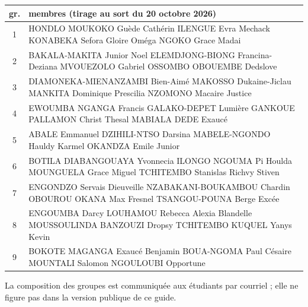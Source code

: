 \documentclass[11pt]{article}
\begin{document}
\ifdefined\versionclasse
\begin{center}
  \footnotesize\renewcommand{\arraystretch}{1.12}\setlength\tabcolsep{4pt}
  \begin{tabular}{c>{\raggedright\arraybackslash}p{}}
    \toprule
    \textbf{gr.} & \textbf{membres (tirage au sort du 20 octobre 2026)} \\
    \midrule
    1 & HONDLO MOUKOKO Guède Cathérin \textperiodcentered{} ILENGUE Evra Mechack \textperiodcentered{} KONABEKA Sefora Gloire Oméga \textperiodcentered{} NGOKO Grace Madai \\
    2 & BAKALA-MAKITA Junior Noel \textperiodcentered{} ELEMDJONG-BIONG Francina-Deziana \textperiodcentered{} MVOUEZOLO Gabriel \textperiodcentered{} OSSOMBO OBOUEMBE Dedslove \\
    3 & DIAMONEKA-MIENANZAMBI Bien-Aimé \textperiodcentered{} MAKOSSO Dukaine-Jiclau \textperiodcentered{} MANKITA Dominique Prescilia \textperiodcentered{} NZOMONO Macaire Justice \\
    4 & EWOUMBA NGANGA Francis \textperiodcentered{} GALAKO-DEPET Lumière \textperiodcentered{} GANKOUE PALLAMON Christ Thesal \textperiodcentered{} MABIALA DEDE Exaucé \\
    5 & ABALE Emmanuel \textperiodcentered{} DZIHILI-NTSO Darsina \textperiodcentered{} MABELE-NGONDO Hauldy Karmel \textperiodcentered{} OKANDZA Emile Junior \\
    6 & BOTILA DIABANGOUAYA Yvonnecia \textperiodcentered{} ILONGO NGOUMA Pi Houlda \textperiodcentered{} MOUNGUELA Grace Miguel \textperiodcentered{} TCHITEMBO Stanislas Richvy Stiven \\
    7 & ENGONDZO Servais Dieuveille \textperiodcentered{} NZABAKANI-BOUKAMBOU Chardin \textperiodcentered{} OBOUROU OKANA Max Fresnel \textperiodcentered{} TSANGOU-POUNA Berge Excée \\
    8 & ENGOUMBA Darcy \textperiodcentered{} LOUHAMOU Rebecca Alexia Blandelle \textperiodcentered{} MOUSSOULINDA BANZOUZI Dropsy \textperiodcentered{} TCHITEMBO KUQUEL Yanys Kevin \\
    9 & BOKOTE MAGANGA Exaucé Benjamin \textperiodcentered{} BOUA-NGOMA Paul Césaire \textperiodcentered{} MOUNTALI Salomon \textperiodcentered{} NGOULOUBI Opportune \\
    \bottomrule
  \end{tabular}
\end{center}
\else
{\small\color{cnfGris}La composition des groupes est communiquée aux étudiants par courriel ; elle ne figure pas dans la version publique de ce guide.}
\fi
\end{document}

